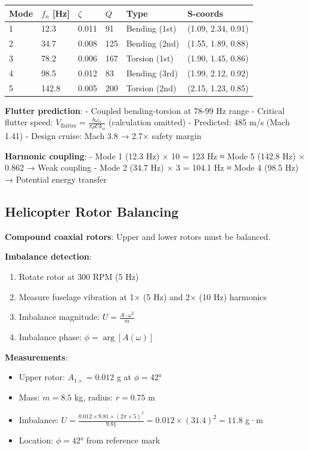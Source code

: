 \documentclass[12pt,a4paper]{article}
\begin{document}
\begin{center}
\begin{tabular}{|l|l|l|l|l|l|}
\hline
\textbf{Mode} & \textbf{$f_n$ [Hz]} & \textbf{$\zeta$} & \textbf{$Q$} & \textbf{Type} & \textbf{S-coords} \\
\hline
1 & 12.3 & 0.011 & 91 & Bending (1st) & (1.09, 2.34, 0.91) \\
2 & 34.7 & 0.008 & 125 & Bending (2nd) & (1.55, 1.89, 0.88) \\
3 & 78.2 & 0.006 & 167 & Torsion (1st) & (1.90, 1.45, 0.86) \\
4 & 98.5 & 0.012 & 83 & Bending (3rd) & (1.99, 2.12, 0.92) \\
5 & 142.8 & 0.005 & 200 & Torsion (2nd) & (2.15, 1.23, 0.85) \\
\hline
\end{tabular}
\end{center}

\textbf{Flutter prediction}:
- Coupled bending-torsion at 78-99 Hz range
- Critical flutter speed: $V_{\text{flutter}} = \frac{b\omega_{\alpha}}{\pi\rho U k_{\alpha}}$ (calculation omitted)
- Predicted: 485 m/s (Mach 1.41)
- Design cruise: Mach 3.8 → 2.7× safety margin

\textbf{Harmonic coupling}:
- Mode 1 (12.3 Hz) × 10 = 123 Hz ≈ Mode 5 (142.8 Hz) × 0.862 → Weak coupling
- Mode 2 (34.7 Hz) × 3 = 104.1 Hz ≈ Mode 4 (98.5 Hz) → Potential energy transfer

\subsection{Helicopter Rotor Balancing}

\textbf{Compound coaxial rotors}: Upper and lower rotors must be balanced.

\textbf{Imbalance detection}:
\begin{enumerate}
\item Rotate rotor at 300 RPM (5 Hz)
\item Measure fuselage vibration at 1× (5 Hz) and 2× (10 Hz) harmonics
\item Imbalance magnitude: $U = \frac{A \cdot \omega^2}{m}$
\item Imbalance phase: $\phi = \arg[A(\omega)]$
\end{enumerate}

\textbf{Measurements}:
\begin{itemize}
\item Upper rotor: $A_{1\times} = 0.012$ g at $\phi = 42°$
\item Mass: $m = 8.5$ kg, radius: $r = 0.75$ m
\item Imbalance: $U = \frac{0.012 \times 9.81 \times (2\pi \times 5)^2}{9.81} = 0.012 \times (31.4)^2 = 11.8$ g·m
\item Location: $\phi = 42°$ from reference mark
\end{itemize}
\end{document}
